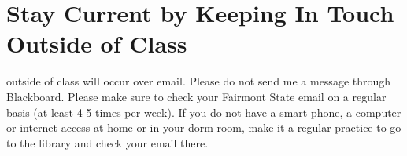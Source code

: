 \section{Stay Current by Keeping In Touch Outside of Class}

 outside of class will occur over email. Please do not send me a message through Blackboard. Please make sure to check your Fairmont State email on a regular basis (at least 4-5 times per week). If you do not have a smart phone, a computer or internet access at home or in your dorm room, make it a regular practice to go to the library and check your email there.
